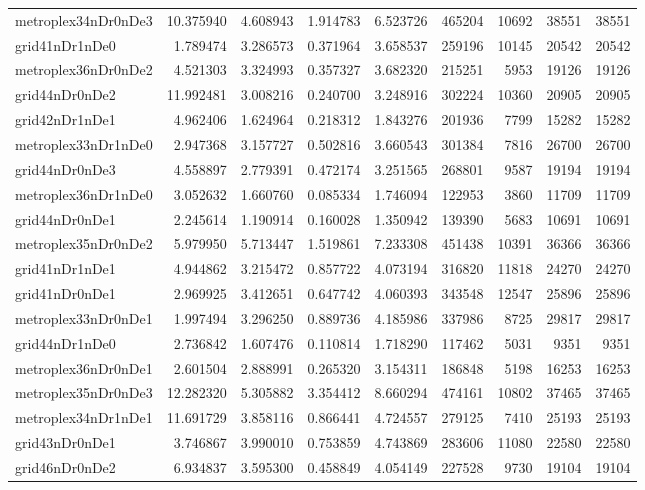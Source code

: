 \begin{longtable}{|l|r|r|r|r|r|r|r|r|}
metroplex34nDr0nDe3 & 10.375940 & 4.608943 & 1.914783 & 6.523726 & 465204 & 10692 & 38551 & 38551 \\
grid41nDr1nDe0 & 1.789474 & 3.286573 & 0.371964 & 3.658537 & 259196 & 10145 & 20542 & 20542 \\
metroplex36nDr0nDe2 & 4.521303 & 3.324993 & 0.357327 & 3.682320 & 215251 & 5953 & 19126 & 19126 \\
grid44nDr0nDe2 & 11.992481 & 3.008216 & 0.240700 & 3.248916 & 302224 & 10360 & 20905 & 20905 \\
grid42nDr1nDe1 & 4.962406 & 1.624964 & 0.218312 & 1.843276 & 201936 & 7799 & 15282 & 15282 \\
metroplex33nDr1nDe0 & 2.947368 & 3.157727 & 0.502816 & 3.660543 & 301384 & 7816 & 26700 & 26700 \\
grid44nDr0nDe3 & 4.558897 & 2.779391 & 0.472174 & 3.251565 & 268801 & 9587 & 19194 & 19194 \\
metroplex36nDr1nDe0 & 3.052632 & 1.660760 & 0.085334 & 1.746094 & 122953 & 3860 & 11709 & 11709 \\
grid44nDr0nDe1 & 2.245614 & 1.190914 & 0.160028 & 1.350942 & 139390 & 5683 & 10691 & 10691 \\
metroplex35nDr0nDe2 & 5.979950 & 5.713447 & 1.519861 & 7.233308 & 451438 & 10391 & 36366 & 36366 \\
grid41nDr1nDe1 & 4.944862 & 3.215472 & 0.857722 & 4.073194 & 316820 & 11818 & 24270 & 24270 \\
grid41nDr0nDe1 & 2.969925 & 3.412651 & 0.647742 & 4.060393 & 343548 & 12547 & 25896 & 25896 \\
metroplex33nDr0nDe1 & 1.997494 & 3.296250 & 0.889736 & 4.185986 & 337986 & 8725 & 29817 & 29817 \\
grid44nDr1nDe0 & 2.736842 & 1.607476 & 0.110814 & 1.718290 & 117462 & 5031 & 9351 & 9351 \\
metroplex36nDr0nDe1 & 2.601504 & 2.888991 & 0.265320 & 3.154311 & 186848 & 5198 & 16253 & 16253 \\
metroplex35nDr0nDe3 & 12.282320 & 5.305882 & 3.354412 & 8.660294 & 474161 & 10802 & 37465 & 37465 \\
metroplex34nDr1nDe1 & 11.691729 & 3.858116 & 0.866441 & 4.724557 & 279125 & 7410 & 25193 & 25193 \\
grid43nDr0nDe1 & 3.746867 & 3.990010 & 0.753859 & 4.743869 & 283606 & 11080 & 22580 & 22580 \\
grid46nDr0nDe2 & 6.934837 & 3.595300 & 0.458849 & 4.054149 & 227528 & 9730 & 19104 & 19104 \\

\end{longtable}
